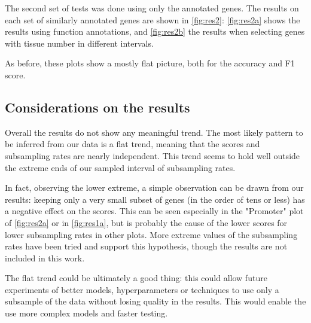 The second set of tests was done using only the annotated genes. The results on each set of similarly annotated genes are shown in \autoref{fig:res2}: \autoref{fig:res2a} shows the results using function annotations, and \autoref{fig:res2b} the results when selecting genes with tissue number in different intervals.

As before, these plots show a mostly flat picture, both for the accuracy and F1 score.


\subsection{Considerations on the results}
Overall the results do not show any meaningful trend. The most likely pattern to be inferred from our data is a flat trend, meaning that the scores and subsampling rates are nearly independent. This trend seems to hold well outside the extreme ends of our sampled interval of subsampling rates.

In fact, observing the lower extreme, a simple observation can be drawn from our results: keeping only a very small subset of genes (in the order of tens or less) has a negative effect on the scores.
This can be seen especially in the "Promoter" plot of \autoref{fig:res2a} or in \autoref{fig:res1a}, but is probably the cause of the lower scores for lower subsampling rates in other plots. More extreme values of the subsampling rates have been tried and support this hypothesis, though the results are not included in this work.

The flat trend could be ultimately a good thing: this could allow future experiments of better models, hyperparameters or techniques to use only a subsample of the data without losing quality in the results. This would enable the use more complex models and faster testing.


